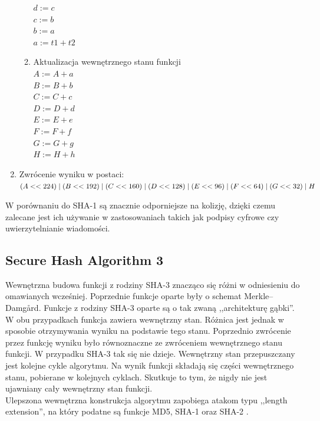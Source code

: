 \begin{enumerate}
\begin{enumerate}
		        $d := c$ \\
		        $c := b$ \\
		        $b := a$ \\
		        $a := t1 + t2$
			\item Aktualizacja wewnętrznego stanu funkcji \\
				$A := A + a$ \\
				$B := B + b$ \\
				$C := C + c$ \\
				$D := D + d$ \\
				$E := E + e$ \\
				$F := F + f$ \\
				$G := G + g$ \\
				$H := H + h$ 
		\end{enumerate}
	\item Zwrócenie wyniku w postaci: \\
		$(A << 224) \mathrel{|} (B << 192) \mathrel{|} (C << 160) \mathrel{|} \\ 
		 (D << 128) \mathrel{|} (E << 96) \mathrel{|} (F << 64) \mathrel{|} (G << 32) \mathrel{|} H$
\end{enumerate}
W porównaniu do SHA-1 są znacznie odporniejsze na kolizję, dzięki czemu zalecane jest ich używanie w zastosowaniach takich jak podpisy cyfrowe czy uwierzytelnianie wiadomości.

\subsection{Secure Hash Algorithm 3}
Wewnętrzna budowa funkcji z rodziny SHA-3 znacząco się różni w odniesieniu do omawianych wcześniej. 
Poprzednie funkcje oparte były o schemat Merkle–Damgård. 
Funkcje z rodziny SHA-3 oparte są o tak zwaną ,,architekturę gąbki''. 
W obu przypadkach funkcja zawiera wewnętrzny stan. 
Różnica jest jednak w sposobie otrzymywania wyniku na podstawie tego stanu. 
Poprzednio zwrócenie przez funkcję wyniku było równoznaczne ze zwróceniem wewnętrznego stanu funkcji. 
W przypadku SHA-3 tak się nie dzieje. Wewnętrzny stan przepuszczany jest kolejne cykle algorytmu. 
Na wynik funkcji składają się części wewnętrznego stanu, pobierane w kolejnych cyklach. 
Skutkuje to tym, że nigdy nie jest ujawniany cały wewnętrzny stan funkcji. \\
Ulepszona wewnętrzna konstrukcja algorytmu zapobiega atakom typu ,,length extension'', 
na który podatne są funkcje MD5, SHA-1 oraz SHA-2 \cite{keccak}.

